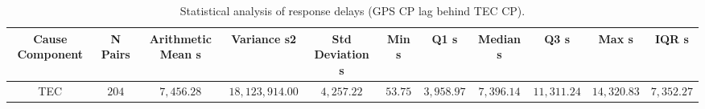 \vspace{-3pt}
\begin{table}[H]
\caption{Statistical analysis of response delays (GPS CP lag behind TEC CP).\label{tab:Response_Delay_Summary_Statistics_300_TEC}}
\begin{tabularx}{\textwidth}{CCCCCCCCCCC}
\toprule
\textbf{Cause Component} & \textbf{N Pairs} & \textbf{Arithmetic Mean s} & \textbf{Variance s2} & \textbf{Std Deviation s} & \textbf{Min s} & \textbf{Q1 s} & \textbf{Median s} & \textbf{Q3 s} & \textbf{Max s} & \textbf{IQR s} \\
\midrule
TEC & $204$ & $7,456.28$ & $18,123,914.00$ & $4,257.22$ & $53.75$ & $3,958.97$ & $7,396.14$ & $11,311.24$ & $14,320.83$ & $7,352.27$ \\
\bottomrule
\end{tabularx}
\end{table}
\vspace{-3pt}
